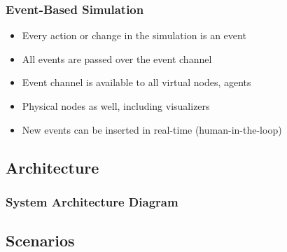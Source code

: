 \documentclass[mathserif,usenames,dvipsnames]{beamer}
\begin{document}
\frame
{
    \frametitle{Event-Based Simulation}
    \begin{itemize}
        \item Every action or change in the simulation is an event
        \item All events are passed over the event channel
        \item Event channel is available to all virtual nodes, agents
        \item Physical nodes as well, including visualizers
        \item New events can be inserted in real-time (human-in-the-loop)
    \end{itemize}
}

\subsection{Architecture}
\frame
{
    \frametitle{System Architecture Diagram}
    \begin{center}
    \begin{figure}
        \resizebox{0.8\textwidth}{!}{}
    \end{figure}
    \end{center}
}


\subsection{Scenarios}
\end{document}

